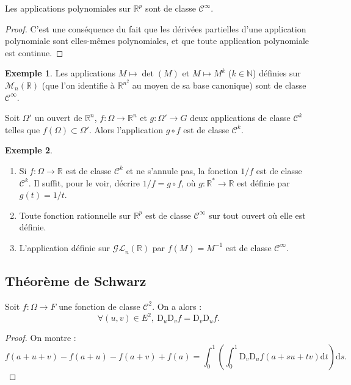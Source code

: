 \documentclass[french]{article}
\newcommand{\N}{\mathbb{N}}
\newcommand{\R}{\mathbb{R}}
\newcommand{\st}{^*}
\newcommand{\inv}{^{-1}}
\renewcommand{\d}{\text{d}}
\newcommand{\D}{\text{D}}
\theoremstyle{plain}
\theoremstyle{definition}
\newtheorem*{ex}{Exemple}
\theoremstyle{remark}
\begin{document}
\begin{prop}%
	Les applications polynomiales sur $\R^p$ sont de classe $\mathcal{C}^\infty$.
\end{prop}
\begin{proof}
	C'est une conséquence du fait que les dérivées partielles d'une application polynomiale sont elles-mêmes polynomiales, et que toute application polynomiale est continue.
\end{proof}

\begin{ex}
	Les applications $M\mapsto\det(M)$ et $M\mapsto M^k$ ($k\in\N$) définies sur $\mathcal{M}_n(\R)$ (que l'on identifie à $\R^{n^2}$ au moyen de sa base canonique) sont de classe $\mathcal{C}^\infty$.
\end{ex}

\begin{prop}%
	Soit $\Omega'$ un ouvert de $\R^n$, $f:\Omega\to\R^n$ et $g:\Omega'\to G$ deux applications de classe $\mathcal{C}^k$ telles que $f(\Omega)\subset\Omega'$. Alors l'application $g\circ f$ est de classe $\mathcal{C}^k$.
\end{prop}

\begin{ex}
	\begin{enumerate}
		\item Si $f:\Omega\to\R$ est de classe $\mathcal{C}^k$ et ne s'annule pas, la fonction $1/f$ est de classe $\mathcal{C}^k$. Il suffit, pour le voir, décrire $1/f=g\circ f$, où $g:\R\st\to\R$ est définie par $g(t)=1/t$.
		\item Toute fonction rationnelle sur $\R^p$ est de classe $\mathcal{C}^\infty$ sur tout ouvert où elle est définie.
		\item L'application définie sur $\mathcal{GL}_n(\R)$ par $f(M)=M\inv$ est de classe $\mathcal{C}^\infty$.
	\end{enumerate}
\end{ex}

\subsection{Théorème de Schwarz}

\begin{lem}%
	Soit $f:\Omega\to F$ une fonction de classe $\mathcal{C}^2$. On a alors : 
	$$\forall (u,v)\in E^2,\ \D_u\D_vf=\D_v\D_uf.$$
\end{lem}
\begin{proof}
	On montre :
	$$f(a+u+v)-f(a+u)-f(a+v)+f(a)=\int_{0}^{1}\left(\int_{0}^{1}\D_v\D_uf(a+su+tv)\d t\right)\d s.$$
\end{proof}
\end{document}
